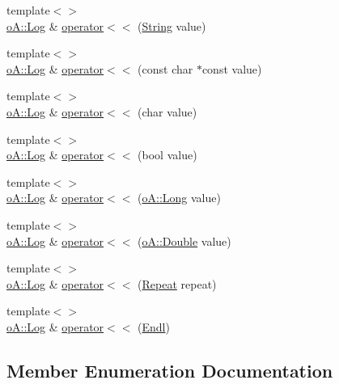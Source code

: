 \begin{DoxyCompactItemize}
\item 
{\footnotesize template$<$$>$ }\\\mbox{\hyperlink{classo_a_1_1_log}{o\+A\+::\+Log}} \& \mbox{\hyperlink{classo_a_1_1_log_acfa81696d9db53900bb4d03f278024ee}{operator$<$$<$}} (\mbox{\hyperlink{classo_a_1_1_string}{String}} value)
\item 
{\footnotesize template$<$$>$ }\\\mbox{\hyperlink{classo_a_1_1_log}{o\+A\+::\+Log}} \& \mbox{\hyperlink{classo_a_1_1_log_ae274c2ff1bc29ba718265e46fcc6207c}{operator$<$$<$}} (const char $\ast$const value)
\item 
{\footnotesize template$<$$>$ }\\\mbox{\hyperlink{classo_a_1_1_log}{o\+A\+::\+Log}} \& \mbox{\hyperlink{classo_a_1_1_log_a54dba53cce06861c82dc760d9c809633}{operator$<$$<$}} (char value)
\item 
{\footnotesize template$<$$>$ }\\\mbox{\hyperlink{classo_a_1_1_log}{o\+A\+::\+Log}} \& \mbox{\hyperlink{classo_a_1_1_log_a151d996709b215055998475e5610ea2c}{operator$<$$<$}} (bool value)
\item 
{\footnotesize template$<$$>$ }\\\mbox{\hyperlink{classo_a_1_1_log}{o\+A\+::\+Log}} \& \mbox{\hyperlink{classo_a_1_1_log_a206fea477101843b2eb9cbc71ebd34cd}{operator$<$$<$}} (\mbox{\hyperlink{namespaceo_a_ab34d92c907da3ac86211277a1341c6c2}{o\+A\+::\+Long}} value)
\item 
{\footnotesize template$<$$>$ }\\\mbox{\hyperlink{classo_a_1_1_log}{o\+A\+::\+Log}} \& \mbox{\hyperlink{classo_a_1_1_log_a59165364886174ee41ef0addd123b216}{operator$<$$<$}} (\mbox{\hyperlink{namespaceo_a_a2bcc976232176d2dcf8b9df1fa33c038}{o\+A\+::\+Double}} value)
\item 
{\footnotesize template$<$$>$ }\\\mbox{\hyperlink{classo_a_1_1_log}{o\+A\+::\+Log}} \& \mbox{\hyperlink{classo_a_1_1_log_af5330fde11ac127dba6a6091e5e12b69}{operator$<$$<$}} (\mbox{\hyperlink{classo_a_1_1_repeat}{Repeat}} repeat)
\item 
{\footnotesize template$<$$>$ }\\\mbox{\hyperlink{classo_a_1_1_log}{o\+A\+::\+Log}} \& \mbox{\hyperlink{classo_a_1_1_log_ace93b1b2eda01f9b9a0c81bc8b23083d}{operator$<$$<$}} (\mbox{\hyperlink{classo_a_1_1_endl}{Endl}})
\end{DoxyCompactItemize}


\subsection{Member Enumeration Documentation}
\mbox{\label{classo_a_1_1_log_a640171dc239ea7befcd640362343f88f}} 

